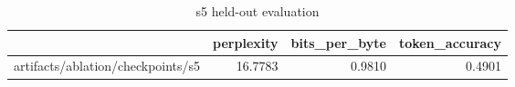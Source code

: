 \begin{table}[t]
\centering
\begin{tabular}{lrrr}
\toprule
 & perplexity & bits\_per\_byte & token\_accuracy \\
\midrule
artifacts/ablation/checkpoints/s5 & 16.7783 & 0.9810 & 0.4901 \\
\bottomrule
\end{tabular}
\caption{s5 held-out evaluation}
\label{tab:s5-eval}
\end{table}
